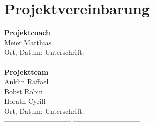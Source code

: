 \clearpage
\section{Projektvereinbarung}\label{sec:Projektvereinbarung}
	\begin{tabbing}
		\textbf{Projektcoach}\\[0.2cm]
		Meier Matthias\\[0.2cm]
		Ort, Datum: \hspace{5cm}\=Unterschrift:
		\\[0.5cm]----------------------------- \>-----------------------------
		\\[0.5cm]
		\textbf{Projektteam}\\[0.2cm]
		Anklin Raffael\\[0.2cm]
		Bobst Robin\\[0.2cm]
		Horath Cyrill\\[0.2cm]
		Ort, Datum: \>Unterschrift:
		\\[0.5cm]----------------------------- \>-----------------------------
	\end{tabbing}
	
	\clearpage



